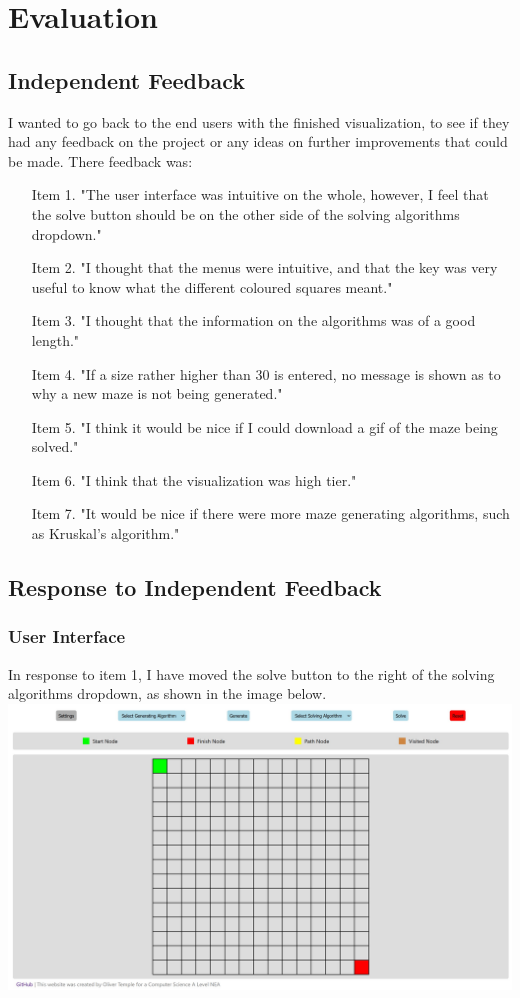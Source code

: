 \documentclass[titlepage]{article}
\begin{document}
\section{Evaluation}
\subsection{Independent Feedback}
I wanted to go back to the end users with the finished visualization, to see if they had any feedback on the project or any ideas on further improvements that could be made.
There feedback was:
\begin{itemize}
    \item[Item 1.]"The user interface was intuitive on the whole, however, I feel that the solve button should be on the other side of the solving algorithms dropdown."
    \item[Item 2.]"I thought that the menus were intuitive, and that the key was very useful to know what the different coloured squares meant."
    \item[Item 3.]"I thought that the information on the algorithms was of a good length."
    \item[Item 4.]"If a size rather higher than 30 is entered, no message is shown as to why a new maze is not being generated."
    \item[Item 5.]"I think it would be nice if I could download a gif of the maze being solved."    
    \item[Item 6.]"I think that the visualization was high tier."
    \item[Item 7.]"It would be nice if there were more maze generating algorithms, such as Kruskal's algorithm."  
\end{itemize}
\subsection{Response to Independent Feedback}
\subsubsection{User Interface}
In response to item 1, I have moved the solve button to the right of the solving algorithms dropdown, as shown in the image below.
\newline
\includegraphics[width=\linewidth]{assets/feedback/item1.jpg}
\end{document}
